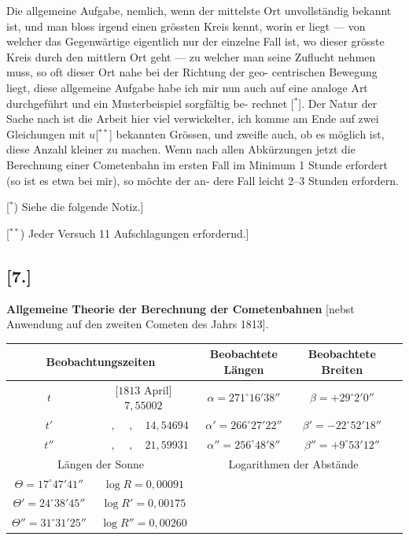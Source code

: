 \documentclass[12pt,a4paper]{article}
\begin{document}
Die allgemeine Aufgabe, nemlich, wenn der mittelste Ort unvollst\"andig
bekannt ist, und man bloss irgend einen gr\"ossten Kreis kennt, worin er liegt
--- von welcher das Gegenw\"artige eigentlich nur der einzelne Fall ist, wo
dieser gr\"osste Kreis durch den mittlern Ort geht --- zu welcher man seine
Zuflucht nehmen muss, so oft dieser Ort nahe bei der Richtung der geo-
centrischen Bewegung liegt, diese allgemeine Aufgabe habe ich mir nun auch
auf eine analoge Art durchgef\"uhrt und ein Musterbeispiel sorgf\"altig be-
rechnet [$^*$]. Der Natur der Sache nach ist die Arbeit hier viel verwickelter,
ich komme am Ende auf zwei Gleichungen mit $u$[$^{**}$] bekannten Gr\"ossen, und
zweifle auch, ob es m\"oglich ist, diese Anzahl kleiner zu machen. Wenn nach
allen Abk\"urzungen jetzt die Berechnung einer Cometenbahn im ersten Fall
im Minimum 1 Stunde erfordert (so ist es etwa bei mir), so m\"ochte der an-
dere Fall leicht 2--3 Stunden erfordern.

\begin{flushright}

[$^*$) Siehe die folgende Notiz.]

[$^{**}$) Jeder Versuch 11 Aufschlagungen erfordernd.]
\end{flushright}

\newpage

\subsection*{[7.]}
\textbf{Allgemeine Theorie der Berechnung der Cometenbahnen}
[nebst Anwendung auf den zweiten Cometen des Jahrs 1813].

\begin{center}
\begin{tabular}{|c|c|c|c|c|}
\hline
\multicolumn{2}{|c|}{Beobachtungszeiten} & Beobachtete L\"angen & Beobachtete Breiten \\
\hline
$t$ & $[1813$ April] $7{,}55002$ & $\alpha = 271^\circ 16' 38''$ & $\beta = +29^\circ 2' 0''$ \\
$t'$ & $\quad\,,\quad\,,\quad 14{,}54694$ & $\alpha' = 266^\circ 27' 22''$ & $\beta' = -22^\circ 52' 18''$ \\
$t''$ & $\quad\,,\quad\,,\quad 21{,}59931$ & $\alpha'' = 256^\circ 48' 8''$ & $\beta'' = +9^\circ 53' 12''$ \\
\hline
\multicolumn{2}{|c|}{L\"angen der Sonne} & \multicolumn{2}{c|}{Logarithmen der Abst\"ande} \\
\hline
$\Theta = 17^\circ 47' 41''$ & $\log R = 0{,}00091$ \\
$\Theta' = 24^\circ 38' 45''$ & $\log R' = 0{,}00175$ \\
$\Theta'' = 31^\circ 31' 25''$ & $\log R'' = 0{,}00260$ \\
\hline
\end{tabular}
\end{center}
\end{document}
